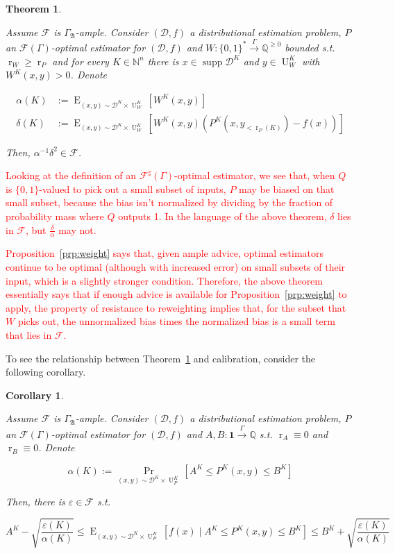 \documentclass[11pt]{article}
\numberwithin{equation}{section}
\theoremstyle{definition}
\theoremstyle{plain}
\newtheorem{theorem}{Theorem}[section]
\newtheorem{corollary}{Corollary}[section]
\newcommand{\Bool}{\{0,1\}}
\newcommand{\Words}{{\Bool^*}}
\DeclareMathOperator{\Supp}{supp}
\DeclareMathOperator{\Prb}{Pr}
\DeclareMathOperator{\E}{E}
\DeclareMathOperator{\R}{r}
\DeclareMathOperator{\Un}{U}
\newcommand{\Nats}{\mathbb{N}}
\newcommand{\Rats}{\mathbb{Q}}
\newcommand{\Dist}{\mathcal{D}}
\newcommand{\GrowA}{\Gamma_{\mathfrak{A}}}
\newcommand{\Fall}{\mathcal{F}}
\newcommand{\EG}{\Fall(\Gamma)}
\newcommand{\ESG}{\Fall^\sharp(\Gamma)}
\newcommand{\Scheme}{\xrightarrow{\Gamma}}
\begin{document}
\begin{theorem}
\label{thm:calib}

Assume $\Fall$ is $\GrowA$-ample. Consider $(\Dist,f)$ a distributional estimation problem, $P$ an $\EG$-optimal estimator for $(\Dist,f)$ and ${W: \Words \Scheme \Rats^{\geq 0}}$ bounded s.t. $\R_W \geq \R_P$ and for every $K \in \Nats^n$ there is $x \in \Supp \Dist^{K}$ and $y \in \Un_W^{K}$ with $W^{K}(x,y) > 0$. Denote

\begin{align*}
\alpha(K)&:=\E_{(x,y) \sim \Dist^{K} \times \Un_W^{K}}[W^{K}(x,y)] \\ 
\delta(K)&:=\E_{(x,y) \sim \Dist^{K} \times \Un_W^{K}}[W^{K}(x,y)(P^{K}(x,y_{<\R_P(K)})-f(x))]
\end{align*} 

Then, $\alpha^{-1}\delta^2 \in \Fall$.

\end{theorem}
\textcolor{red}{Looking at the definition of an $\ESG$-optimal estimator, we see that, when $Q$ is $\{0,1\}$-valued to pick out a small subset of inputs, $P$ may be biased on that small subset, because the bias isn't normalized by dividing by the fraction of probability mass where $Q$ outputs 1. In the language of the above theorem, $\delta$ lies in $\Fall$, but $\frac{\delta}{\alpha}$ may not.}

\textcolor{red}{Proposition~\ref{prp:weight} says that, given ample advice, optimal estimators continue to be optimal (although with increased error) on small subsets of their input, which is a slightly stronger condition. Therefore, the above theorem essentially says that if enough advice is available for Proposition~\ref{prp:weight} to apply, the property of resistance to reweighting implies that, for the subset that $W$ picks out, the unnormalized bias times the normalized bias is a small term that lies in $\Fall$.}

To see the relationship between Theorem~\ref{thm:calib} and calibration, consider the following corollary.

\begin{corollary}
\label{crl:calib}

Assume $\Fall$ is $\GrowA$-ample. Consider $(\Dist,f)$ a distributional estimation problem, $P$ an $\EG$-optimal estimator for $(\Dist,f)$ and $A,B: \bm{1} \Scheme \Rats$ s.t. $\R_A \equiv 0$ and $\R_B \equiv 0$. Denote

\[\alpha(K):=\Prb_{(x,y) \sim \Dist^{K} \times \Un_P^{K}}[A^{K} \leq P^{K}(x,y) \leq B^{K}]\] 

Then, there is $\varepsilon \in \Fall$ s.t. 

\begin{equation}
\label{eqn:crl__calib}
A^{K} - \sqrt{\frac{\varepsilon(K)}{\alpha(K)}} \leq \E_{(x,y) \sim \Dist^{K} \times \Un_P^{K}}[f(x) \mid A^{K} \leq P^{K}(x,y) \leq B^{K}] \leq B^{K} + \sqrt{\frac{\varepsilon(K)}{\alpha(K)}}
\end{equation}

\end{corollary}
\end{document}
